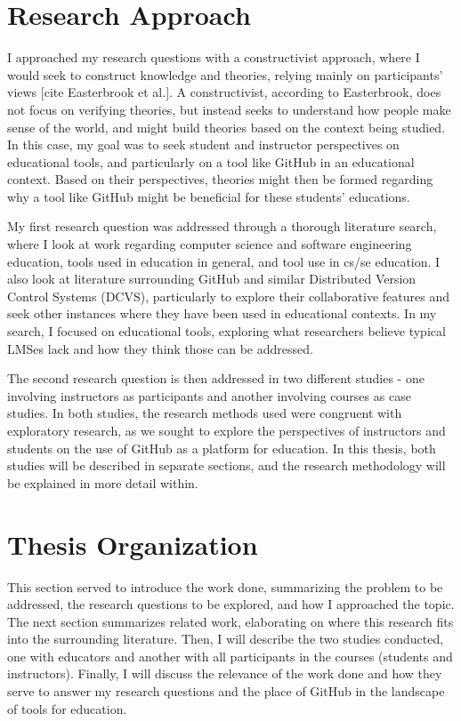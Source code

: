 \section{Research Approach}
I approached my research questions with a constructivist approach, where I would seek to construct knowledge and theories, relying mainly on participants' views [cite Easterbrook et al.]. A constructivist, according to Easterbrook, does not focus on verifying theories, but instead seeks to understand how people make sense of the world, and might build theories based on the context being studied. In this case, my goal was to seek student and instructor perspectives on educational tools, and particularly on a tool like GitHub in an educational context. Based on their perspectives, theories might then be formed regarding why a tool like GitHub might be beneficial for these students' educations.


My first research question was addressed through a thorough literature search, where I look at work regarding computer science and software engineering education, tools used in education in general, and tool use in cs/se education. I also look at literature surrounding GitHub and similar Distributed Version Control Systems (DCVS), particularly to explore their collaborative features and seek other instances where they have been used in educational contexts. In my search, I focused on educational tools, exploring what researchers believe typical LMSes lack and how they think those can be addressed.

The second research question is then addressed in two different studies - one involving instructors as participants and another involving courses as case studies. In both studies, the research methods used were congruent with exploratory research, as we sought to explore the perspectives of instructors and students on the use of GitHub as a platform for education. In this thesis, both studies will be described in separate sections, and the research methodology will be explained in more detail within.

\section{Thesis Organization}
This section served to introduce the work done, summarizing the problem to be addressed, the research questions to be explored, and how I approached the topic. The next section summarizes related work, elaborating on where this research fits into the surrounding literature. Then, I will describe the two studies conducted, one with educators and another with all participants in the courses (students and instructors). Finally, I will discuss the relevance of the work done and how they serve to answer my research questions and the place of GitHub in the landscape of tools for education.






